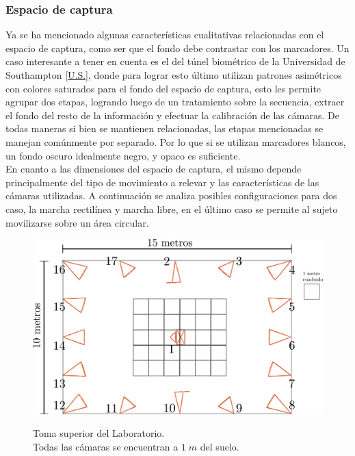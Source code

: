\subsubsection{Espacio de captura}

Ya se ha mencionado algunas características cualitativas relacionadas con el espacio de captura, como ser que el fondo debe contrastar con los marcadores. Un caso interesante a tener en cuenta es el del túnel biométrico de la Universidad de Southampton \ref{U.S.}, donde para lograr esto último utilizan patrones asimétricos con colores saturados para el fondo del espacio de captura, esto les permite agrupar dos etapas, logrando luego de un tratamiento sobre la secuencia, extraer el fondo del resto de la información y efectuar la calibración de las cámaras. De todas maneras si bien se mantienen relacionadas, las etapas mencionadas se manejan comúnmente por separado. Por lo que si se utilizan marcadores blancos, un fondo oscuro idealmente negro, y opaco es suficiente.\\

En cuanto a las dimensiones del espacio de captura, el mismo depende principalmente del tipo de movimiento a relevar y las características de las cámaras utilizadas. A continuación se analiza posibles configuraciones para dos caso, la marcha rectilínea y marcha libre, en el último caso se permite al sujeto movilizarse sobre un área circular.


\begin{figure}[H]
  \centering
  {\includegraphics[scale=0.2]{img/Base_Datos/Laboratorio.pdf}\label{img_Laboratorio}}      
  \caption{Toma superior del Laboratorio.\\ Todas las cámaras se encuentran a $1\;m$ del suelo.}
  \label{estimacion_resolucion}
\end{figure}  
 
